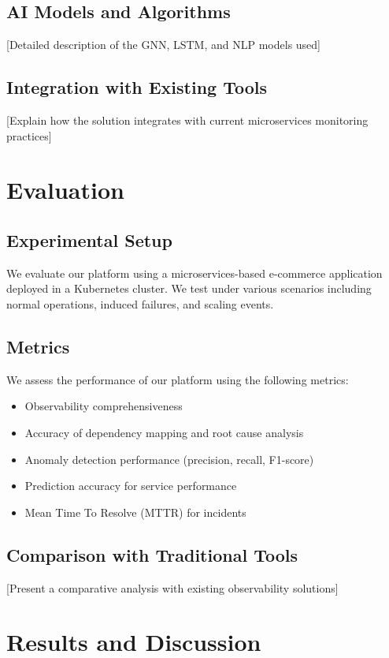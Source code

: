 \documentclass[10pt,journal,compsoc]{IEEEtran}
\begin{document}
\subsection{AI Models and Algorithms}
[Detailed description of the GNN, LSTM, and NLP models used]

\subsection{Integration with Existing Tools}
[Explain how the solution integrates with current microservices monitoring practices]

\section{Evaluation}
\subsection{Experimental Setup}
We evaluate our platform using a microservices-based e-commerce application deployed in a Kubernetes cluster. We test under various scenarios including normal operations, induced failures, and scaling events.

\subsection{Metrics}
We assess the performance of our platform using the following metrics:
\begin{itemize}
    \item Observability comprehensiveness
    \item Accuracy of dependency mapping and root cause analysis
    \item Anomaly detection performance (precision, recall, F1-score)
    \item Prediction accuracy for service performance
    \item Mean Time To Resolve (MTTR) for incidents
\end{itemize}

\subsection{Comparison with Traditional Tools}
[Present a comparative analysis with existing observability solutions]

\section{Results and Discussion}
\end{document}
